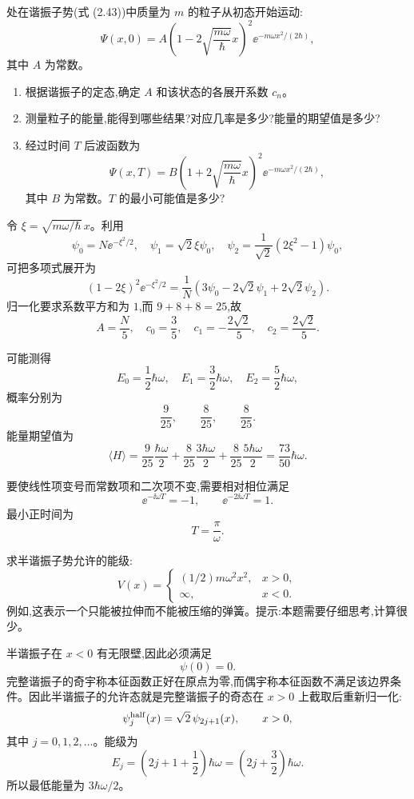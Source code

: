 \begin{question}
处在谐振子势(式 (2.43))中质量为 $m$ 的粒子从初态开始运动:
\[
\Psi(x,0)=A\left(1-2\sqrt{\frac{m\omega}{\hbar}}x\right)^2 \ee^{-m\omega x^2/(2\hbar)},
\]
其中 $A$ 为常数。
\begin{enumerate}
\item 根据谐振子的定态,确定 $A$ 和该状态的各展开系数 $c_n$。
\item 测量粒子的能量,能得到哪些结果?对应几率是多少?能量的期望值是多少?
\item 经过时间 $T$ 后波函数为
\[
\Psi(x,T)=B\left(1+2\sqrt{\frac{m\omega}{\hbar}}x\right)^2 \ee^{-m\omega x^2/(2\hbar)},
\]
其中 $B$ 为常数。$T$ 的最小可能值是多少?
\end{enumerate}

\par\smallskip
{}

\end{question}
\begin{solution}
令 $\xi=\sqrt{m\omega/\hbar}\,x$。利用
\[
\psi_0=N \ee^{-\xi^2/2},\quad
\psi_1=\sqrt2\xi\psi_0,
\quad
\psi_2=\frac1{\sqrt2}(2\xi^2-1)\psi_0,
\]
可把多项式展开为
\[
(1-2\xi)^2\ee^{-\xi^2/2}
=\frac1N\left(3\psi_0-2\sqrt2\psi_1+2\sqrt2\psi_2\right).
\]
归一化要求系数平方和为 $1$,而 $9+8+8=25$,故
\[
A=\frac{N}{5},
\quad
c_0=\frac35,
\quad
c_1=-\frac{2\sqrt2}{5},
\quad
c_2=\frac{2\sqrt2}{5}.
\]

可能测得
\[
E_0=\frac12\hbar\omega,
\quad E_1=\frac32\hbar\omega,
\quad E_2=\frac52\hbar\omega,
\]
概率分别为
\[
\frac9{25},\qquad \frac8{25},\qquad \frac8{25}.
\]
能量期望值为
\[
\langle H\rangle=\frac9{25}\frac{\hbar\omega}{2}
+\frac8{25}\frac{3\hbar\omega}{2}
+\frac8{25}\frac{5\hbar\omega}{2}
=\frac{73}{50}\hbar\omega.
\]

要使线性项变号而常数项和二次项不变,需要相对相位满足
\[
\ee^{-\ii\omega T}=-1,
\qquad \ee^{-2\ii\omega T}=1.
\]
最小正时间为
\[
T=\frac{\pi}{\omega}.
\]
\end{solution}

\begin{question}
求半谐振子势允许的能级:
\[
V(x)=\begin{cases}(1/2)m\omega^2x^2,&x>0,\\ \infty,&x<0.
\end{cases}
\]
例如,这表示一个只能被拉伸而不能被压缩的弹簧。提示:本题需要仔细思考,计算很少。
\end{question}
\begin{solution}
半谐振子在 $x<0$ 有无限壁,因此必须满足
\[
\psi(0)=0.
\]
完整谐振子的奇宇称本征函数正好在原点为零,而偶宇称本征函数不满足该边界条件。因此半谐振子的允许态就是完整谐振子的奇态在 $x>0$ 上截取后重新归一化:
\[
\psi^{\rm half}_j(x)=\sqrt2\,\psi_{2j+1}(x),\qquad x>0,
\]
其中 $j=0,1,2,\ldots$。能级为
\[
E_j=\left(2j+1+\frac12\right)\hbar\omega
=\left(2j+\frac32\right)\hbar\omega.
\]
所以最低能量为 $3\hbar\omega/2$。
\end{solution}

